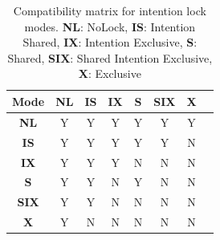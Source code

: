 

\begin{table}[h]
    \centering
    \captionsetup{justification=centering}
    \begin{tabular}{c|ccccccc}
        \textbf{Mode} & \textbf{NL} & \textbf{IS} & \textbf{IX} & \textbf{S} & \textbf{SIX} & \textbf{X}\\
        \hline
        \textbf{NL} & \cellcolor{green!25} Y & \cellcolor{green!25} Y & \cellcolor{green!25} Y & \cellcolor{green!25} Y & \cellcolor{green!25} Y & \cellcolor{green!25} Y \\
        \textbf{IS} &  \cellcolor{green!25} Y & \cellcolor{green!25} Y & \cellcolor{green!25} Y & \cellcolor{green!25} Y & \cellcolor{green!25} Y & \cellcolor{red!25} N \\
        \textbf{IX} &  \cellcolor{green!25} Y & \cellcolor{green!25} Y & \cellcolor{green!25} Y & \cellcolor{red!25} N & \cellcolor{red!25} N & \cellcolor{red!25} N \\
        \textbf{S} &  \cellcolor{green!25} Y & \cellcolor{green!25} Y & \cellcolor{red!25} N & \cellcolor{green!25} Y & \cellcolor{red!25} N & \cellcolor{red!25} N \\
        \textbf{SIX} &  \cellcolor{green!25} Y & \cellcolor{green!25} Y & \cellcolor{red!25} N & \cellcolor{red!25} N & \cellcolor{red!25} N & \cellcolor{red!25} N \\
        \textbf{X} &  \cellcolor{green!25} Y & \cellcolor{red!25} N & \cellcolor{red!25} N & \cellcolor{red!25} N & \cellcolor{red!25} N & \cellcolor{red!25} N \\
    \end{tabular}
    \caption{Compatibility matrix for intention lock modes. \textbf{NL}: NoLock, \textbf{IS}: Intention Shared, \textbf{IX}: Intention Exclusive, \textbf{S}: Shared, \textbf{SIX}: Shared Intention Exclusive, \textbf{X}: Exclusive}
    \label{tab:intention_locks}
\end{table}



